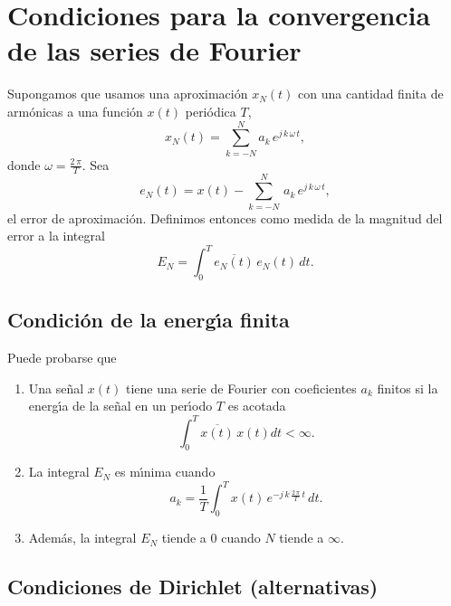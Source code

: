 \section{Condiciones para la convergencia de las series de Fourier}

Supongamos que usamos una aproximaci\'{o}n $x_{N}(t) $ con una
cantidad finita de arm\'{o}nicas a una funci\'{o}n $x(t) $
peri\'{o}dica $T$,
\begin{equation}
x_{N}\left( t\right) =\sum_{k=-N}^{N}a_{k} \, e^{j \, k \, \omega \, t},
\end{equation}
donde $\omega = \frac{2 \, \pi}{T}$.
Sea 
\begin{equation}
e_{N}\left( t\right) =x( t) -\sum_{k=-N}^{N} \, a_{k} \, e^{j \, k \, \omega \, t},
\end{equation}
el error de aproximaci\'{o}n. Definimos entonces como medida de la magnitud
del error a la integral 
\begin{equation}
E_{N}=\int_{0}^{T} \overline{e_{N}(t)} \, e_{N}(t) \, dt.
\end{equation}

\subsection{Condici\'{o}n de la energ\'{\i}a finita}

Puede probarse que 
\begin{enumerate}
\item Una se\~{n}al $x\left( t\right) $ tiene una serie de Fourier con
coeficientes $a_{k}$ finitos si la energ\'{\i}a de la se\~{n}al en un per\'{\i}odo $T$ es acotada
\begin{equation}
\int_{0}^{T} \overline{x(t)} \, x(t) dt<\infty .
\end{equation}

\item La integral $E_{N}$ es m\'{\i}nima cuando 
\begin{equation}
a_{k}=
  \frac{1}{T}\int_{0}^{T}x(t) \, e^{-j \, k \, \frac{2 \, \pi }{T}  \, t} \, dt.
\end{equation}

\item Adem\'{a}s, la integral $E_{N}$ tiende a $0$ cuando $N$ tiende a $\infty$.

\end{enumerate}

\subsection{Condiciones de Dirichlet (alternativas)}

